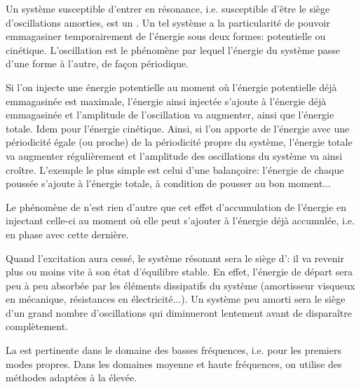 \medskip
Un système susceptible d'entrer en résonance, i.e. susceptible d'être le siège d'oscillations 
amorties, est un . Un tel système a la particularité de pouvoir 
emmagasiner temporairement de l'énergie sous deux formes: potentielle ou cinétique. L'oscillation est le 
phénomène par lequel l'énergie du système passe d'une forme à l'autre, de façon périodique.

Si l'on injecte une énergie potentielle au moment où l'énergie potentielle déjà emmagasinée est 
maximale, l'énergie ainsi injectée s'ajoute à l'énergie déjà emmagasinée et l'amplitude de l'oscillation 
va augmenter, ainsi que l'énergie totale. Idem pour l'énergie cinétique. 
Ainsi, si l'on apporte de l'énergie avec une périodicité égale (ou proche) de la périodicité propre du 
système, l'énergie totale va augmenter régulièrement et l'amplitude des oscillations du système va 
ainsi croître. 
L'exemple le plus simple est celui d'une balançoire: 
l'énergie de chaque poussée s'ajoute à l'énergie totale, à condition de pousser au bon moment...

Le phénomène de  n'est rien d'autre que cet effet 
d'accumulation de l'énergie en injectant celle-ci au moment où elle peut s'ajouter à l'énergie déjà 
accumulée, i.e. \og en phase\fg{} avec cette dernière.

\medskip
Quand l'excitation aura cessé, le système résonant sera le siège d': 
il va revenir plus ou moins vite à son état d'équilibre stable. 
En effet, l'énergie de départ sera peu à peu absorbée par les éléments dissipatifs du système 
(amortisseur visqueux en mécanique, résistances en électricité...). 
Un système peu amorti sera le siège d'un grand nombre d'oscillations qui diminueront lentement avant 
de disparaître complètement.

\medskip
La  est pertinente dans le domaine 
des basses fréquences,  i.e. pour les premiers modes propres. 
Dans les domaines moyenne et haute fréquences, on utilise des méthodes adaptées à la 
 élevée.

